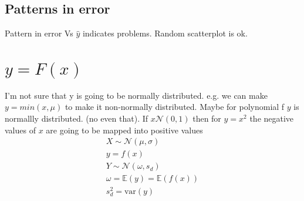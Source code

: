 \documentclass{article}
\newcommand{\ber}{\begin{eqnarray}}
\newcommand{\eer}{\end{eqnarray}}
\begin{document}
\subsection{Patterns in error}
Pattern in error Vs $\hat{y}$ indicates problems. Random scatterplot is ok.
\section{$y=F(x)$}
I'm not sure that y is going to be normally distributed. e.g. we can make $y=min(x,\mu)$ to make it non-normally distributed. Maybe for polynomial f $y$ is normallly distributed. (no even that). If $x\mathcal{N}(0,1)$ then for $y=x^2$ the negative values of $x$ are going to be mapped into positive values\\
\ber
X \sim \mathcal{N}(\mu,\sigma)\\
y = f(x) \\
Y \sim \mathcal{N}(\omega,s_d)\\
\omega = \mathbb{E}(y) = \mathbb{E}(f(x))\\
s_d^2 = \text{var}(y)
\eer
\end{document}
